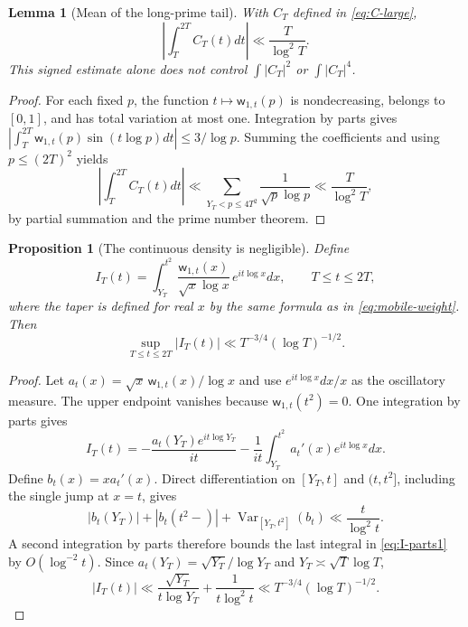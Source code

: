 \documentclass[11pt,leqno]{amsart}
\numberwithin{equation}{section}
\newtheorem{proposition}[theorem]{Proposition}
\newtheorem{lemma}[theorem]{Lemma}
\theoremstyle{definition}
\theoremstyle{remark}
\newcommand{\1}{\mathbf 1}
\newcommand{\Var}{\operatorname{Var}}
\newcommand{\wt}{\mathsf w}
\begin{document}
\begin{lemma}[Mean of the long-prime tail]\label{lem:long-mean}
With $C_T$ defined in \eqref{eq:C-large},
\begin{equation}\label{eq:long-mean}
 \boxed{\left|\int_T^{2T}C_T(t)dt\right|\ll\frac{T}{\log^2T}.}
\end{equation}
This signed estimate alone does not control $\int|C_T|^2$ or $\int|C_T|^4$.
\end{lemma}
\begin{proof}
For each fixed $p$, the function $t\mapsto\wt_{1,t}(p)$ is nondecreasing, belongs to $[0,1]$, and has total variation at most one. Integration by parts gives $|\int_T^{2T}\wt_{1,t}(p)\sin(t\log p)dt|\le3/\log p$. Summing the coefficients and using $p\le(2T)^2$ yields
\[
 \left|\int_T^{2T}C_T(t)dt\right|
 \ll\sum_{Y_T<p\le4T^2}\frac1{\sqrt p\log p}
 \ll\frac{T}{\log^2T},
\]
by partial summation and the prime number theorem.
\end{proof}
\begin{proposition}[The continuous density is negligible]\label{prop:continuous-prime}
Define
\begin{equation}\label{eq:continuous-I}
 I_T(t)=\int_{Y_T}^{t^2}\frac{\wt_{1,t}(x)}{\sqrt x\log x}\,e^{it\log x}dx,
 \qquad T\le t\le2T,
\end{equation}
where the taper is defined for real $x$ by the same formula as in \eqref{eq:mobile-weight}. Then
\begin{equation}\label{eq:continuous-small}
 \boxed{\sup_{T\le t\le2T}|I_T(t)|\ll T^{-3/4}(\log T)^{-1/2}.}
\end{equation}
\end{proposition}
\begin{proof}
Let $a_t(x)=\sqrt x\,\wt_{1,t}(x)/\log x$ and use $e^{it\log x}dx/x$ as the oscillatory measure. The upper endpoint vanishes because $\wt_{1,t}(t^2)=0$. One integration by parts gives
\begin{equation}\label{eq:I-parts1}
 I_T(t)=-\frac{a_t(Y_T)e^{it\log Y_T}}{it}
 -\frac1{it}\int_{Y_T}^{t^2}a_t'(x)e^{it\log x}dx.
\end{equation}
Define $b_t(x)=xa_t'(x)$. Direct differentiation on $[Y_T,t]$ and $(t,t^2]$, including the single jump at $x=t$, gives
\begin{equation}\label{eq:b-var}
 |b_t(Y_T)|+|b_t(t^2-)|+\Var_{[Y_T,t^2]}(b_t)\ll\frac t{\log^2t}.
\end{equation}
A second integration by parts therefore bounds the last integral in \eqref{eq:I-parts1} by $O(\log^{-2}t)$. Since $a_t(Y_T)=\sqrt{Y_T}/\log Y_T$ and $Y_T\asymp\sqrt T\log T$,
\[
 |I_T(t)|\ll\frac{\sqrt{Y_T}}{t\log Y_T}+\frac1{t\log^2t}
 \ll T^{-3/4}(\log T)^{-1/2}.
\]
\end{proof}
\end{document}

